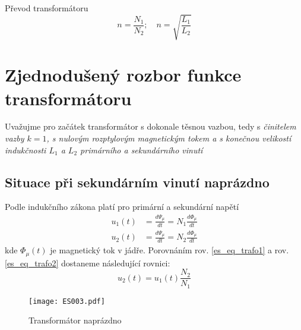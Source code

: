     Převod transformátoru
    \begin{equation}\label{es:eq_turn_ratio}
        n = \frac{N_1}{N_2}; \quad n=\sqrt{\frac{L_1}{L_2}}
    \end{equation}
    
  \section{Zjednodušený rozbor funkce transformátoru}\label{ES:kap_simple_rozbor_trafa}
    Uvažujme pro začátek transformátor s dokonale těsnou vazbou, tedy s \emph{činitelem vazby
    $k=1$, s nulovým rozptylovým magnetickým tokem a s konečnou velikostí indukčnosti $L_1$ a $L_2$
    primárního a sekundárního vinutí}

    \subsection{Situace při sekundárním vinutí naprázdno}\label{ES:kap_rozbor_trafa}
      Podle indukčního zákona platí pro primární a sekundární napětí
      \begin{subequations}\label{ES:eq_015}
        \begin{align}
          u_1(t)&=\frac{d\Psi_\mu}{dt} 
                 = N_1\frac{d\Phi_\mu}{dt}\label{es_eq_trafo1} \\
          u_2(t)&=\frac{d\Psi_\mu}{dt} 
                 = N_2\frac{d\Phi_\mu}{dt}\label{es_eq_trafo2}  
        \end{align}
      \end{subequations}      
      kde $\Phi_\mu(t)$ je magnetický tok v jádře. Porovnáním rov. \ref{es_eq_trafo1} a rov. 
      \ref{es_eq_trafo2} dostaneme následující rovnici:
      \begin{equation}\label{es_int_uprim_trafo}
          u_2(t)=u_1(t)\frac{N_2}{N_1}
      \end{equation}

      \begin{figure}[ht!]   %
        \centering
        \texttt{[image: ES003.pdf]}
        \caption{Transformátor naprázdno}
        \label{ENZ:fig_003}
      \end{figure}
      
